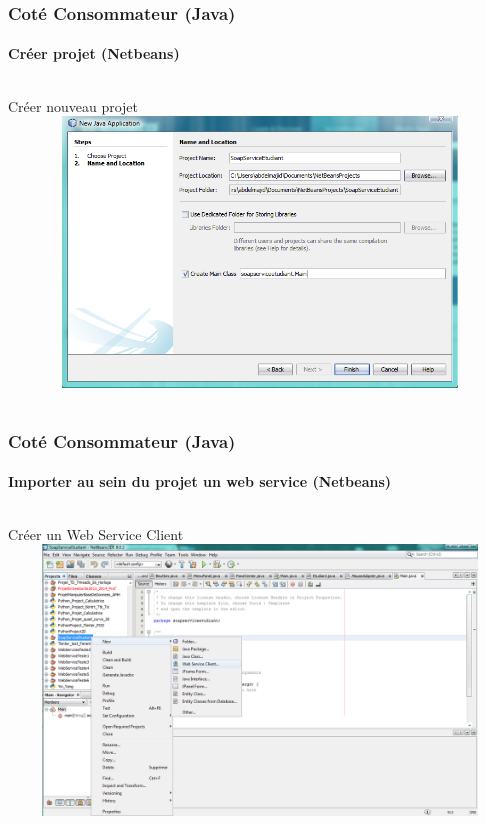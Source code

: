 \begin{frame}
\frametitle{Coté Consommateur (Java)}
\framesubtitle{Créer projet (Netbeans)}
\transsplithorizontalin[duration=1]
\begin{columns}
\begin{column}{16cm}
 \begin{alertblock}{Créer nouveau projet}
 \includegraphics[width=16cm,height=7.2cm]{images/clientCaptures/etape2_new_project.png}
  \end{alertblock}
\end{column}
\end{columns}
\end{frame}


\begin{frame}
\frametitle{Coté Consommateur (Java)}
\framesubtitle{Importer au sein du projet un web service (Netbeans)}
\transsplithorizontalin[duration=1]
\begin{columns}
\begin{column}{16cm}
 \begin{alertblock}{Créer un Web Service Client}
 \includegraphics[width=16cm,height=7.2cm]{images/clientCaptures/etape3_client_web_service.png}
  \end{alertblock}
\end{column}
\end{columns}
\end{frame}

